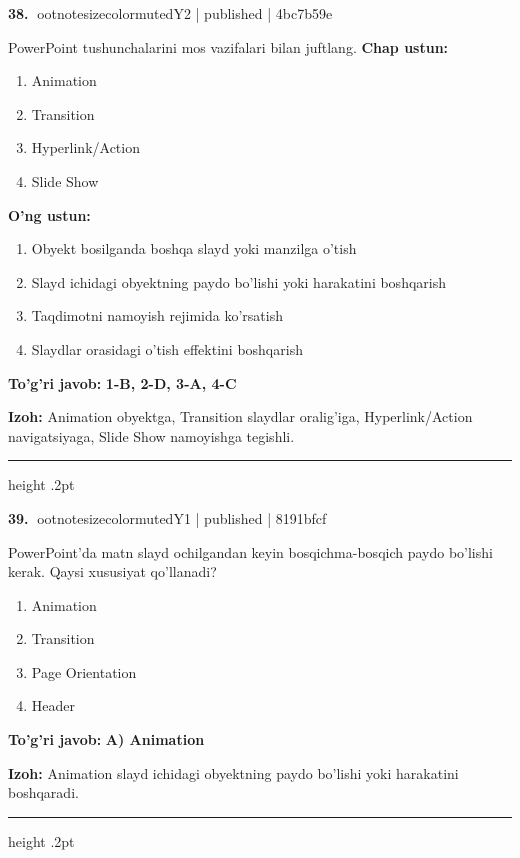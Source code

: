 \documentclass[10pt,a4paper]{article}
\begin{document}
\textbf{\color{ink}38.} {ootnotesizecolor{muted}Y2 | published | 4bc7b59e}
\par
PowerPoint tushunchalarini mos vazifalari bilan juftlang.
\textbf{Chap ustun:}\begin{enumerate}[label=\arabic*),leftmargin=9mm]
\item Animation
\item Transition
\item Hyperlink/Action
\item Slide Show
\end{enumerate}
\textbf{O'ng ustun:}\begin{enumerate}[label=\Alph*),leftmargin=9mm]
\item Obyekt bosilganda boshqa slayd yoki manzilga o'tish
\item Slayd ichidagi obyektning paydo bo'lishi yoki harakatini boshqarish
\item Taqdimotni namoyish rejimida ko'rsatish
\item Slaydlar orasidagi o'tish effektini boshqarish
\end{enumerate}
\begin{tcolorbox}[enhanced,breakable,colback=teal!4,colframe=teal!55!black,boxrule=0.45pt,arc=1.2mm,left=2.8mm,right=2.8mm,top=2mm,bottom=2mm]
\textbf{\color{teal}To'g'ri javob:} \textbf{1-B, 2-D, 3-A, 4-C}
\par\smallskip
\textbf{Izoh:} Animation obyektga, Transition slaydlar oralig'iga, Hyperlink/Action navigatsiyaga, Slide Show namoyishga tegishli.
\end{tcolorbox}
\vspace{2mm}\hrule height .2pt\vspace{2mm}

\textbf{\color{ink}39.} {ootnotesizecolor{muted}Y1 | published | 8191bfcf}
\par
PowerPoint'da matn slayd ochilgandan keyin bosqichma-bosqich paydo bo'lishi kerak. Qaysi xususiyat qo'llanadi?
\begin{enumerate}[label=\Alph*),leftmargin=9mm]
\item Animation
\item Transition
\item Page Orientation
\item Header
\end{enumerate}
\begin{tcolorbox}[enhanced,breakable,colback=teal!4,colframe=teal!55!black,boxrule=0.45pt,arc=1.2mm,left=2.8mm,right=2.8mm,top=2mm,bottom=2mm]
\textbf{\color{teal}To'g'ri javob:} \textbf{A) Animation}
\par\smallskip
\textbf{Izoh:} Animation slayd ichidagi obyektning paydo bo'lishi yoki harakatini boshqaradi.
\end{tcolorbox}
\vspace{2mm}\hrule height .2pt\vspace{2mm}
\end{document}
